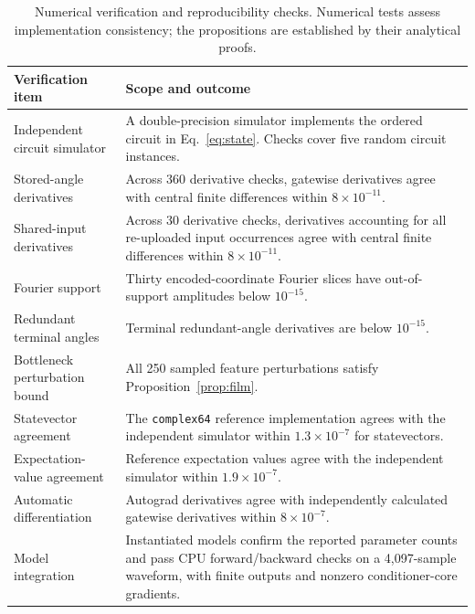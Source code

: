 \documentclass[10pt,a4paper]{article}
\begin{document}
\begin{table}[htbp]
\centering
\caption{Numerical verification and reproducibility checks.
Numerical tests assess implementation consistency; the
propositions are established by their analytical proofs.}
\label{tab:numerical_verification}
\small
\renewcommand{\arraystretch}{1.15}
\begin{tabularx}{\textwidth}{
    @{}p{}X@{}
}
\toprule
\textbf{Verification item} &
\textbf{Scope and outcome} \\
\midrule

Independent circuit simulator &
A double-precision simulator implements the ordered circuit
in Eq.~\eqref{eq:state}. Checks cover five random circuit
instances. \\

Stored-angle derivatives &
Across 360 derivative checks, gatewise derivatives agree
with central finite differences within
$8\times10^{-11}$. \\

Shared-input derivatives &
Across 30 derivative checks, derivatives accounting for
all re-uploaded input occurrences agree with central finite
differences within $8\times10^{-11}$. \\

Fourier support &
Thirty encoded-coordinate Fourier slices have
out-of-support amplitudes below $10^{-15}$. \\

Redundant terminal angles &
Terminal redundant-angle derivatives are below
$10^{-15}$. \\

Bottleneck perturbation bound &
All 250 sampled feature perturbations satisfy
Proposition~\ref{prop:film}. \\

Statevector agreement &
The \texttt{complex64} reference implementation agrees
with the independent simulator within $1.3\times10^{-7}$
for statevectors. \\

Expectation-value agreement &
Reference expectation values agree with the independent
simulator within $1.9\times10^{-7}$. \\

Automatic differentiation &
Autograd derivatives agree with independently calculated
gatewise derivatives within $8\times10^{-7}$. \\

Model integration &
Instantiated models confirm the reported parameter counts
and pass CPU forward/backward checks on a 4,097-sample
waveform, with finite outputs and nonzero
conditioner-core gradients. \\


\end{tabularx}
\end{table}
\end{document}
